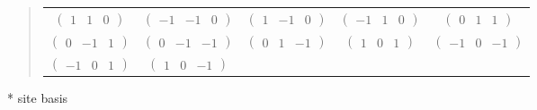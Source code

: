 \documentclass[fleqn,9pt,landscape]{jsarticle}
\begin{document}
\begin{quote}
\begin{tabular}{ccccc}
$ \begin{pmatrix} 1 & 1 & 0 \end{pmatrix} $ & $ \begin{pmatrix} -1 & -1 & 0 \end{pmatrix} $ & $ \begin{pmatrix} 1 & -1 & 0 \end{pmatrix} $ & $ \begin{pmatrix} -1 & 1 & 0 \end{pmatrix} $ & $ \begin{pmatrix} 0 & 1 & 1 \end{pmatrix} $ \\
$ \begin{pmatrix} 0 & -1 & 1 \end{pmatrix} $ & $ \begin{pmatrix} 0 & -1 & -1 \end{pmatrix} $ & $ \begin{pmatrix} 0 & 1 & -1 \end{pmatrix} $ & $ \begin{pmatrix} 1 & 0 & 1 \end{pmatrix} $ & $ \begin{pmatrix} -1 & 0 & -1 \end{pmatrix} $ \\
$ \begin{pmatrix} -1 & 0 & 1 \end{pmatrix} $ & $ \begin{pmatrix} 1 & 0 & -1 \end{pmatrix} $ & $  $ & $  $ & $  $
\end{tabular}
\end{quote}
* site basis
\end{document}
